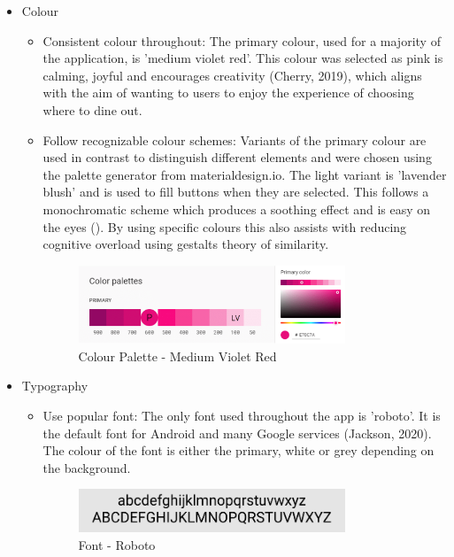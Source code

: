 \documentclass[a4 paper, 12pt]{article}
\begin{document}
        \begin{itemize}
            \item Colour
                \begin{itemize}
                    \item Consistent colour throughout: The primary colour, used for a majority of the application, is 'medium violet red'. This colour was selected as pink is calming, joyful and encourages creativity (Cherry, 2019), which aligns with the aim of wanting to users to enjoy the experience of choosing where to dine out.
                    \item Follow recognizable colour schemes: Variants of the primary colour are used in contrast to distinguish different elements and were chosen using the palette generator from materialdesign.io. The light variant is 'lavender blush' and is used to fill buttons when they are selected. This follows a monochromatic scheme which produces a soothing effect and is easy on the eyes (). By using specific colours this also assists with reducing cognitive overload using gestalts theory of similarity.   
                    \begin{figure} [H]
                        \centering
                        \includegraphics[width=0.8\textwidth, frame]
                            {./Med_Fidelity/Med_Report/images/colour_med.PNG}
                        \caption{Colour Palette - Medium Violet Red}
                    \end{figure}
                \end{itemize}

            \item Typography
                \begin{itemize}
                    \item Use popular font: The only font used throughout the app is 'roboto'. It is the default font for Android and many Google services (Jackson, 2020). The colour of the font is either the primary, white or grey depending on the background.
                    \begin{figure} [H]
                        \centering
                        \includegraphics[width=0.8\textwidth, frame]
                            {./Med_Fidelity/Med_Report/images/font.PNG}
                        \caption{Font - Roboto}
                    \end{figure}                    
                \end{itemize}


\end{itemize}
\end{document}
